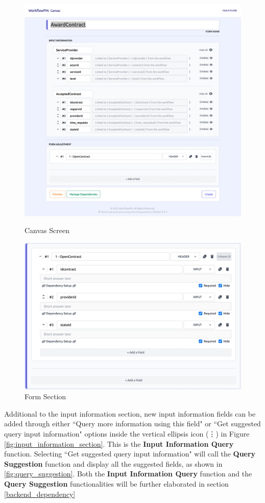 \begin{figure}[ht!]
\centering
\begin{minipage}{.5\textwidth}
  \centering
  \includegraphics[width=0.9\linewidth]{overleaf/images/screens/canvas_screen.png}
  \caption{Canvas Screen}
  \label{fig:canvas_screen}
\end{minipage}%
\begin{minipage}{.5\textwidth}
  \centering
  \includegraphics[width=0.9\linewidth]{overleaf/images/screens/form_section.png}
  \caption{Form Section}
  \label{fig:form_section}
\end{minipage}
\end{figure}


Additional to the input information section, new input information fields can be added through either ``Query more information using this field" or ``Get suggested query input information" options inside the vertical ellipsis icon (\vdots) in Figure \ref{fig:input_information_section}. This is the \textbf{Input Information Query} function. Selecting ``Get suggested query input information" will call the \textbf{Query Suggestion} function and display all the suggested fields, as shown in \ref{fig:query_suggestion}. Both the \textbf{Input Information Query} function and the \textbf{Query Suggestion} functionalities will be further elaborated in section \ref{backend_dependency}




